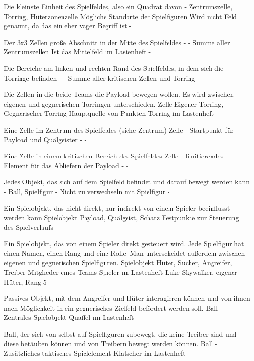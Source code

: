 {Die kleinste Einheit des Spielfeldes, also ein Quadrat davon}
{-}
{Zentrumszelle, Torring, Hüterzonenzelle}
{Mögliche Standorte der Spielfiguren}
{Wird nicht Feld genannt, da das ein eher vager Begriff ist}
{-}

{Der 3x3 Zellen große Abschnitt in der Mitte des Spielfeldes}
{-}
{-}
{Summe aller Zentrumszellen}
{Ist das Mittelfeld im Lastenheft}
{-}

{Die Bereiche am linken und rechten Rand des Spielfeldes, in dem sich die Torringe befinden}
{-}
{-}
{Summe aller kritischen Zellen und Torring}
{-}
{-}

{Die Zellen in die beide Teams die Payload bewegen wollen. Es wird zwischen eigenen und gegnerischen Torringen unterschieden.}
{Zelle}
{Eigener Torring, Gegnerischer Torring}
{Hauptquelle von Punkten}
{Torring im Lastenheft}
{}

{Eine Zelle im Zentrum des Spielfeldes (siehe Zentrum)}
{Zelle}
{-}
{Startpunkt für Payload und Quälgeister}
{-}
{-}

{Eine Zelle in einem kritischen Bereich des Spielfeldes}
{Zelle}
{-}
{limitierendes Element für das Abliefern der Payload}
{-}
{-}

{Jedes Objekt, das sich auf dem Spielfeld befindet und darauf bewegt werden kann}
{-}
{Ball, Spielfigur}
{-}
{Nicht zu verwechseln mit Spielfigur}
{-}

{Ein Spielobjekt, das nicht direkt, nur indirekt von einem Spieler beeinflusst werden kann}
{Spielobjekt}
{Payload, Quälgeist, Schatz}
{Festpunkte zur Steuerung des Spielverlaufs}
{-}
{-}

{Ein Spielobjekt, das von einem Spieler direkt gesteuert wird. Jede Spielfigur hat einen Namen, einen Rang und eine Rolle. Man unterscheidet außerdem zwischen eigenen und gegnerischen Spielfiguren.}
{Spielobjekt}
{Hüter, Sucher, Angreifer, Treiber}
{Mitglieder eines Teams}
{Spieler im Lastenheft}
{Luke Skywalker, eigener Hüter, Rang 5}

{Passives Objekt, mit dem Angreifer und Hüter interagieren können und von ihnen nach Möglichkeit in ein gegnerisches Zielfeld befördert werden soll.}
{Ball}
{-}
{Zentrales Spielobjekt}
{\glqq{} Quaffel\grqq{}  im Lastenheft}
{-}

{Ball, der sich von selbst auf Spielfiguren zubewegt, die keine Treiber sind und diese betäuben können und von Treibern bewegt werden können.}
{Ball}
{-}
{Zusätzliches taktisches Spielelement}
{\glqq{} Klatscher\grqq{}  im Lastenheft}
{-}

